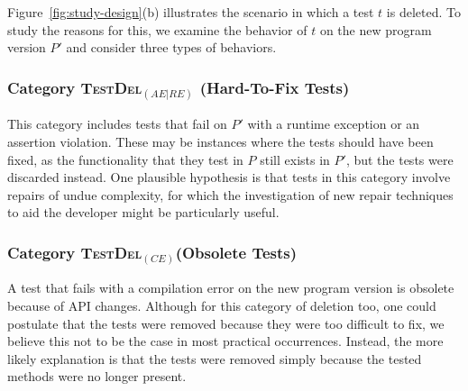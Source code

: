 \documentclass[conference]{IEEEtran}
\newcommand{\lang}[1]{\texttt{\small #1}}
\newcommand{\subject}[1]{\texttt{\small #1}}
\newcommand{\mt}{\mathit}
\newcommand{\catdelaere}{\textsc{TestDel}$_\mt{(AE|RE)}$}
\newcommand{\catdelce}{\textsc{TestDel}$_\mt{(CE)}$}
\begin{document}
Figure~\ref{fig:study-design}(b) illustrates the scenario in which a
test $t$ is deleted. To study the reasons for this, we examine the
behavior of $t$ on the new program version $P'$ and consider three
types of behaviors.

\subsubsection{Category \catdelaere{} (Hard-To-Fix Tests)}
\label{sec:category-delaere}


This category includes tests that fail on $P'$ with a runtime
exception or an assertion violation. These may be instances where the
tests should have been fixed, as the functionality that they test in
$P$ still exists in $P'$, but the tests were discarded instead. One
plausible hypothesis is that tests in this category involve repairs of
undue complexity, for which the investigation of new repair techniques
to aid the developer might be particularly useful.

\subsubsection{Category \catdelce (Obsolete Tests)}
\label{sec:category-delce}

A test that fails with a compilation error on the new program version
is obsolete because of API changes.
%
%
%
Although for this category of deletion too, one could postulate that
the tests were removed because they were too difficult to fix, we
believe this not to be the case in most practical occurrences.
Instead, the more likely explanation is that the tests were removed
simply because the tested methods were no longer present.
\end{document}
